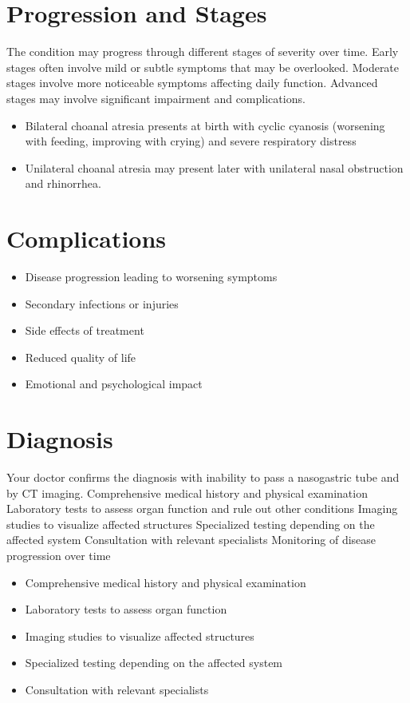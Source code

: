 \section{Progression and Stages}
The condition may progress through different stages of severity over time. Early stages often involve mild or subtle symptoms that may be overlooked. Moderate stages involve more noticeable symptoms affecting daily function. Advanced stages may involve significant impairment and complications.

\begin{itemize}[noitemsep]
  \item Bilateral choanal atresia presents at birth with cyclic cyanosis (worsening with feeding, improving with crying) and severe respiratory distress
  \item Unilateral choanal atresia may present later with unilateral nasal obstruction and rhinorrhea.
\end{itemize}
\section{Complications}
\begin{itemize}[noitemsep]
  \item Disease progression leading to worsening symptoms
  \item Secondary infections or injuries
  \item Side effects of treatment
  \item Reduced quality of life
  \item Emotional and psychological impact
\end{itemize}
\section{Diagnosis}
Your doctor confirms the diagnosis with inability to pass a nasogastric tube and by CT imaging. Comprehensive medical history and physical examination Laboratory tests to assess organ function and rule out other conditions Imaging studies to visualize affected structures Specialized testing depending on the affected system Consultation with relevant specialists Monitoring of disease progression over time

\begin{itemize}[noitemsep]
  \item Comprehensive medical history and physical examination
  \item Laboratory tests to assess organ function
  \item Imaging studies to visualize affected structures
  \item Specialized testing depending on the affected system
  \item Consultation with relevant specialists
\end{itemize}
